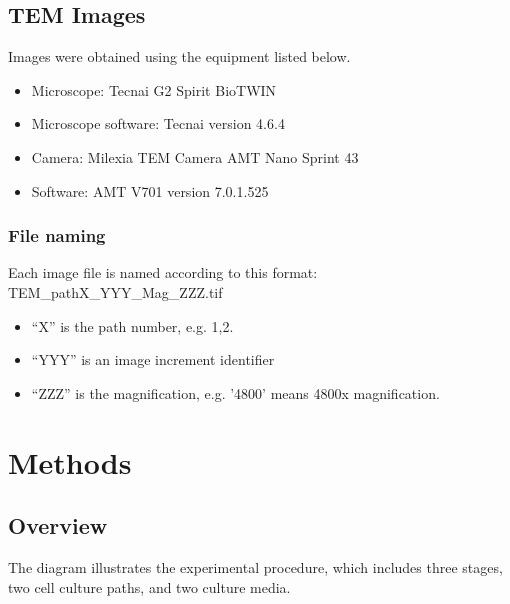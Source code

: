 \documentclass[12pt,a4paper]{article}
\begin{document}
\subsection{TEM Images}
Images were obtained using the equipment listed below.
\begin{itemize}
    \item Microscope: Tecnai G2 Spirit BioTWIN
    \item Microscope software: Tecnai version 4.6.4
    \item Camera: Milexia TEM Camera AMT Nano Sprint 43
    \item Software: AMT V701 version 7.0.1.525
\end{itemize}
\subsubsection{File naming}
Each image file is named according to this format: TEM\_pathX\_YYY\_Mag\_ZZZ.tif
\begin{itemize}
    \item “X” is the path number, e.g. 1,2.
    \item “YYY” is an image increment identifier
    \item “ZZZ” is the magnification, e.g. '4800' means 4800x magnification.
\end{itemize}

\section{Methods}
\subsection{Overview}
The diagram illustrates the experimental procedure, which includes three stages, two cell culture paths, and two culture media.
\begin{center}
\end{center}
\end{document}

